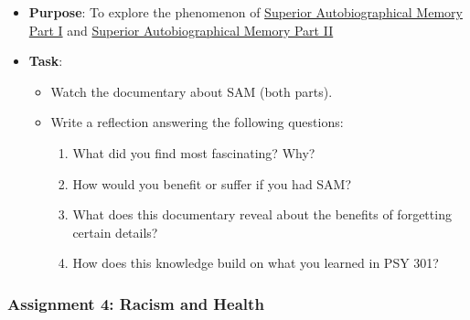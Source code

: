 \documentclass[
]{article}
\providecommand{\tightlist}{%
  \setlength{\itemsep}{0pt}\setlength{\parskip}{0pt}}
\begin{document}
\begin{itemize}
\tightlist
\item
  \textbf{Purpose}: To explore the phenomenon of \href{https://www.youtube.com/watch?v=2zTkBgHNsWM}{Superior Autobiographical Memory Part I} and
  \href{https://www.youtube.com/watch?v=1th1fVIc8Vo}{Superior Autobiographical Memory Part II}
\item
  \textbf{Task}:

  \begin{itemize}
  \tightlist
  \item
    Watch the documentary about SAM (both parts).\\
  \item
    Write a reflection answering the following questions:

    \begin{enumerate}
    \def\labelenumi{\arabic{enumi}.}
    \tightlist
    \item
      What did you find most fascinating? Why?\\
    \item
      How would you benefit or suffer if you had SAM?\\
    \item
      What does this documentary reveal about the benefits of forgetting certain details?\\
    \item
      How does this knowledge build on what you learned in PSY 301?
    \end{enumerate}
  \end{itemize}
\end{itemize}

\hypertarget{assignment-4-racism-and-health}{%
\subsubsection{Assignment 4: Racism and Health}\label{assignment-4-racism-and-health}}
\end{document}
